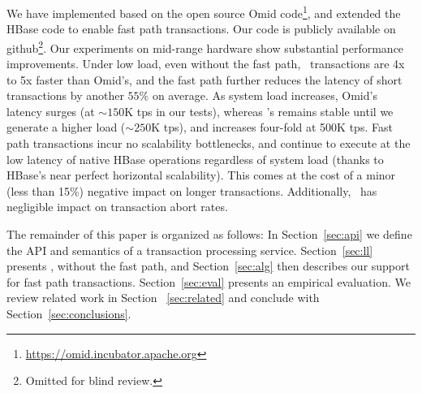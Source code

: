 We have implemented {\sys\/} %
based on the open source Omid code\footnote{\url{https://omid.incubator.apache.org}}, 
and extended the HBase code to enable fast path 
transactions. %
Our code is publicly available on github\footnote{Omitted for blind review.}. 
Our experiments on mid-range hardware show substantial performance improvements.
Under low load,
even without the fast path, \sys\ transactions are 4x to 5x faster than Omid's, 
and the fast path further reduces the latency of short transactions by another $55\%$ on average.
As system load increases, Omid's latency surges (at  $\sim\!\!\!150$K tps in our tests),  
whereas \sys's remains stable until we generate a higher load ($\sim\!\!250$K tps), and 
increases four-fold at 500K tps.  Fast path transactions incur no scalability
bottlenecks, and continue to execute at the low latency of native HBase operations regardless of system load
(thanks to HBase's near perfect horizontal scalability).
This comes at the cost of a minor (less than 15\%) negative impact on longer transactions. 
Additionally, \sys\ has negligible impact on  transaction abort rates.

The remainder of this paper is organized as follows:
In Section~\ref{sec:api} we define the  API and semantics of a transaction processing service. 
Section~\ref{sec:ll} presents \sys, without the fast path, and 
Section~\ref{sec:alg} then describes our support for fast path  transactions.  
Section~\ref{sec:eval} presents an empirical evaluation.
We review related work in Section ~\ref{sec:related} and conclude with Section~\ref{sec:conclusions}.
